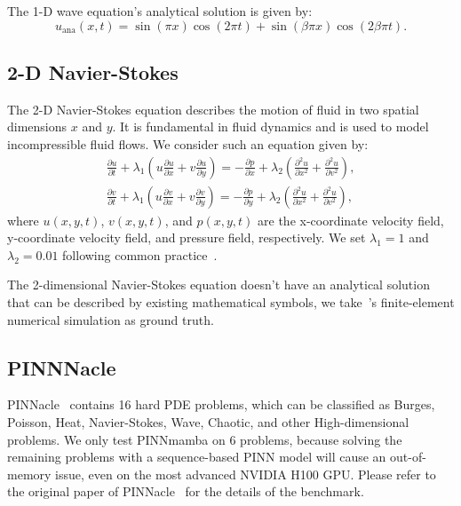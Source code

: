 The 1-D wave equation's analytical solution is given by:
\begin{equation}
    u_\text{ana}(x,t)=\sin(\pi x)\cos(2\pi t)+\sin(\beta \pi x)\cos(2\beta \pi t).
\end{equation}

\subsection{2-D Navier-Stokes}

The 2-D Navier-Stokes equation describes the motion of fluid in two spatial dimensions $x$ and $y$. It is fundamental in fluid dynamics and is used to model incompressible fluid flows. We consider such an equation given by:
\begin{gather}
    \frac{\partial u}{\partial t} + \lambda_1 (u\frac{\partial u}{\partial x} + v \frac{\partial u}{\partial y}) = - \frac{\partial p}{\partial x} + \lambda_2 (\frac{\partial^2 u}{\partial x^2} + \frac{\partial^2 u}{\partial v^2}), \nonumber \\
    \frac{\partial v}{\partial t} + \lambda_1 (u\frac{\partial v}{\partial x} + v \frac{\partial v}{\partial y}) = - \frac{\partial p}{\partial y} + \lambda_2 (\frac{\partial^2 u}{\partial x^2} + \frac{\partial^2 u}{\partial v^2}),
\end{gather}
where $u(x,y,t)$, $v(x,y,t)$, and $p(x,y,t)$ are the x-coordinate velocity field, y-coordinate velocity field, and pressure field, respectively. We set $\lambda_1 = 1$ and $\lambda_2 = 0.01$ following common practice~\cite{zhao2024pinnsformer,raissi2019physics}. 

The 2-dimensional Navier-Stokes equation doesn't have an analytical solution that can be described by existing mathematical symbols, we take~\citet{raissi2019physics}'s finite-element numerical simulation as ground truth. 

\subsection{PINNNacle}
PINNacle~\cite{hao2023pinnacle} contains 16 hard PDE problems, which can be classified as Burges, Poisson, Heat, Navier-Stokes, Wave, Chaotic, and other High-dimensional problems. We only test PINNmamba on 6 problems, because solving the remaining problems with a sequence-based PINN model will cause an out-of-memory issue, even on the most advanced NVIDIA H100 GPU. Please refer to the original paper of PINNacle~\cite{hao2023pinnacle} for the details of the benchmark.

